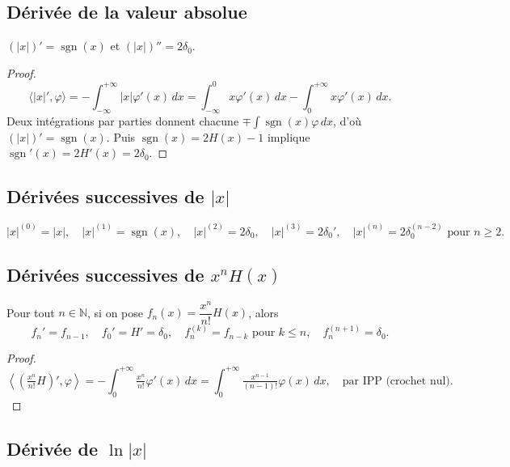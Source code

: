 \documentclass[12pt,a4paper,openany]{book}
\theoremstyle{definition}
\theoremstyle{plain}
\theoremstyle{remark}
\begin{document}
	\subsection{Dérivée de la valeur absolue}
	
	\begin{proposition}
		$(|x|)' = \operatorname{sgn}(x)$ et $(|x|)'' = 2\delta_0$.
	\end{proposition}
	
	\begin{proof}
		\[
		\langle|x|',\varphi\rangle = -\int_{-\infty}^{+\infty}|x|\varphi'(x)\,dx
		= \int_{-\infty}^0 x\varphi'(x)\,dx - \int_0^{+\infty}x\varphi'(x)\,dx.
		\]
		Deux intégrations par parties donnent chacune $\mp\int\operatorname{sgn}(x)\varphi\,dx$, d'où $(|x|)' = \operatorname{sgn}(x)$.
		Puis $\operatorname{sgn}(x) = 2H(x) - 1$ implique $\operatorname{sgn}'(x) = 2H'(x) = 2\delta_0$.
	\end{proof}
	
	\subsection{Dérivées successives de \texorpdfstring{$|x|$}{|x|}}
	
	\[
	|x|^{(0)} = |x|, \quad
	|x|^{(1)} = \operatorname{sgn}(x), \quad
	|x|^{(2)} = 2\delta_0, \quad
	|x|^{(3)} = 2\delta_0', \quad
	|x|^{(n)} = 2\delta_0^{(n-2)} \text{ pour } n \geq 2.
	\]
	
	\subsection{Dérivées successives de \texorpdfstring{$x^n H(x)$}{xn H(x)}}
	
	\begin{proposition}
		Pour tout $n \in \mathbb{N}$, si on pose $f_n(x) = \dfrac{x^n}{n!}H(x)$, alors
		\[
		f_n' = f_{n-1}, \quad f_0' = H' = \delta_0, \quad f_n^{(k)} = f_{n-k} \text{ pour } k \leq n, \quad f_n^{(n+1)} = \delta_0.
		\]
	\end{proposition}
	
	\begin{proof}
		\[
		\left\langle \left(\tfrac{x^n}{n!}H\right)', \varphi\right\rangle
		= -\int_0^{+\infty}\tfrac{x^n}{n!}\varphi'(x)\,dx
		= \int_0^{+\infty}\tfrac{x^{n-1}}{(n-1)!}\varphi(x)\,dx, \quad \text{par IPP (crochet nul)}.
		\]
	\end{proof}
	
	\subsection{Dérivée de \texorpdfstring{$\ln|x|$}{ln|x|}}
	
\end{document}
